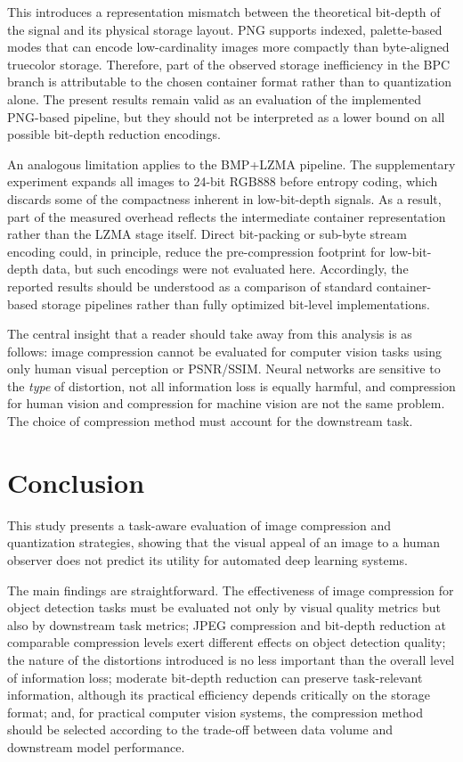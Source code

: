 \documentclass[12pt, a4paper]{article}
\begin{document}
This introduces a representation mismatch between the theoretical bit-depth of the signal and its physical storage layout. PNG supports indexed, palette-based modes that can encode low-cardinality images more compactly than byte-aligned truecolor storage. Therefore, part of the observed storage inefficiency in the BPC branch is attributable to the chosen container format rather than to quantization alone. The present results remain valid as an evaluation of the implemented PNG-based pipeline, but they should not be interpreted as a lower bound on all possible bit-depth reduction encodings.

An analogous limitation applies to the BMP+LZMA pipeline. The supplementary experiment expands all images to 24-bit RGB888 before entropy coding, which discards some of the compactness inherent in low-bit-depth signals. As a result, part of the measured overhead reflects the intermediate container representation rather than the LZMA stage itself. Direct bit-packing or sub-byte stream encoding could, in principle, reduce the pre-compression footprint for low-bit-depth data, but such encodings were not evaluated here. Accordingly, the reported results should be understood as a comparison of standard container-based storage pipelines rather than fully optimized bit-level implementations.

The central insight that a reader should take away from this analysis is as follows: image compression cannot be evaluated for computer vision tasks using only human visual perception or PSNR/SSIM. Neural networks are sensitive to the \textit{type} of distortion, not all information loss is equally harmful, and compression for human vision and compression for machine vision are not the same problem. The choice of compression method must account for the downstream task.

\section{Conclusion}
This study presents a task-aware evaluation of image compression and quantization strategies, showing that the visual appeal of an image to a human observer does not predict its utility for automated deep learning systems.

The main findings are straightforward. The effectiveness of image compression for object detection tasks must be evaluated not only by visual quality metrics but also by downstream task metrics; JPEG compression and bit-depth reduction at comparable compression levels exert different effects on object detection quality; the nature of the distortions introduced is no less important than the overall level of information loss; moderate bit-depth reduction can preserve task-relevant information, although its practical efficiency depends critically on the storage format; and, for practical computer vision systems, the compression method should be selected according to the trade-off between data volume and downstream model performance.
\end{document}
